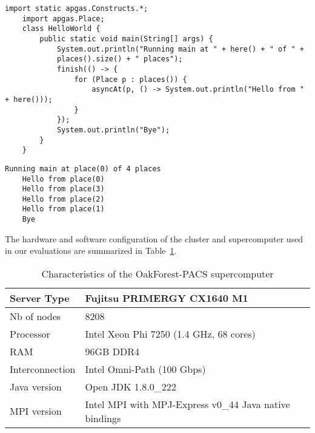 \begin{lstlisting}[float,caption={Distributed Hello World in Java},label={lst:javahello}]
	import static apgas.Constructs.*;
	import apgas.Place;
	class HelloWorld {
		public static void main(String[] args) {
			System.out.println("Running main at " + here() + " of " + 
			places().size() + " places");
			finish(() -> {
				for (Place p : places()) {
					asyncAt(p, () -> System.out.println("Hello from " + here()));
				}
			});
			System.out.println("Bye");
		}
	}
\end{lstlisting}

\begin{lstlisting}[float,caption={Possible output of the Listing~\ref{lst:javahello} program running with 4 processes},label={lst:javahellooutput}]
	Running main at place(0) of 4 places
	Hello from place(0)
	Hello from place(3)
	Hello from place(2)
	Hello from place(1)
	Bye
\end{lstlisting}


The hardware and software configuration of the cluster and supercomputer used in our evaluations are summarized in Table~\ref{tbl:ofp}.

\begin{table}[ht]
	\centering
	\caption{Characteristics of the OakForest-PACS supercomputer}
	\label{tbl:ofp}
	\begin{tabular}{ll}
		\toprule
		Server Type & Fujitsu PRIMERGY CX1640 M1 \\
		\midrule
		Nb of nodes & 8208 \\
		Processor & Intel Xeon Phi 7250 (1.4 GHz, 68 cores) \\
		RAM & 96GB DDR4 \\
		Interconnection & Intel Omni-Path (100 Gbps) \\
		Java version & Open JDK 1.8.0\_222 \\
		MPI version & Intel MPI with MPJ-Express v0\_44 Java native bindings \\
		\bottomrule
	\end{tabular}
\end{table}